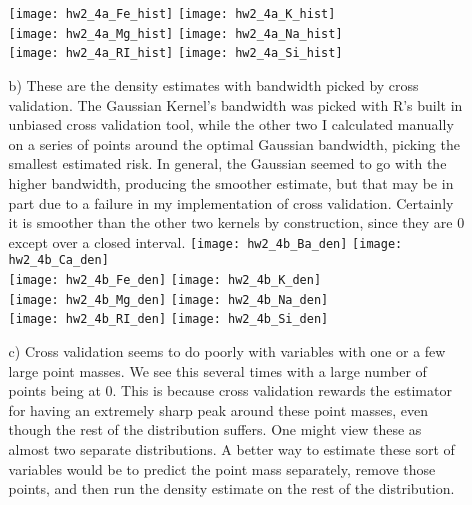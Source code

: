 \documentclass[11pt]{article}
\theoremstyle{definition}
\begin{document}
\begin{itemize}
\begin{itemize}
                \texttt{[image: hw2\_4a\_Fe\_hist]} 
                \texttt{[image: hw2\_4a\_K\_hist]}   \\
                \texttt{[image: hw2\_4a\_Mg\_hist]}
                \texttt{[image: hw2\_4a\_Na\_hist]}  \\
                \texttt{[image: hw2\_4a\_RI\_hist]} 
                \texttt{[image: hw2\_4a\_Si\_hist]}  \\
            \item[b)]
                These are the density estimates with bandwidth picked by cross validation. The Gaussian Kernel's bandwidth was picked with R's built in unbiased cross validation tool, while the other two I calculated manually on a series of points around the optimal Gaussian bandwidth, picking the smallest estimated risk. In general, the Gaussian seemed to go with the higher bandwidth, producing the smoother estimate, but that may be in part due to a failure in my implementation of cross validation. Certainly it is smoother than the other two kernels by construction, since they are $0$ except over a closed interval. 
                \texttt{[image: hw2\_4b\_Ba\_den]}
                \texttt{[image: hw2\_4b\_Ca\_den]} \\ 
                \texttt{[image: hw2\_4b\_Fe\_den]} 
                \texttt{[image: hw2\_4b\_K\_den]}   \\
                \texttt{[image: hw2\_4b\_Mg\_den]}
                \texttt{[image: hw2\_4b\_Na\_den]}  \\
                \texttt{[image: hw2\_4b\_RI\_den]} 
                \texttt{[image: hw2\_4b\_Si\_den]}  \\
            \item[c)]
                Cross validation seems to do poorly with variables with one or a few large point masses. We see this several times with a large number of points being at $0$. This is because cross validation rewards the estimator for having an extremely sharp peak around these point masses, even though the rest of the distribution suffers. One might view these as almost two separate distributions. A better way to estimate these sort of variables would be to predict the point mass separately, remove those points, and then run the density estimate on the rest of the distribution.


        \end{itemize}                                          
\end{itemize}
\end{document}
